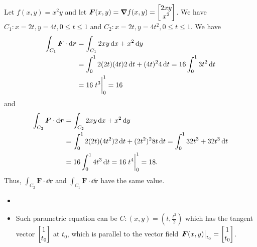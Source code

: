 \documentclass[8pt,twocolumn]{article}
\begin{document}
\begin{Answer}[number=30]
  Let $f(x,y)=x^2y$ and let $\bm{F}(x,y)=\grad f(x,y) = \mqty[2xy\\ x^2]$. We
  have $C_1: x=2t, y=4t, 0\le t\le 1$ and $C_2: x=2t, y=4t^2, 0\le t\le 1$. We
  have
  \begin{align*}
    \int_{C_1} \bm{F}\cdot \dd{\bm{r}} &= \int_{C_1} 2xy \dd{x} + x^2\dd{y} \\
    &= \int_0^1 2(2t)(4t) 2\dd{t} + (4t)^2 4\dd{t} = 16\int_0^1 3t^2\dd{t} \\
    &=16 \eval{t^3}_0^1 = 16
  \end{align*}
  and
  \begin{align*}
    \int_{C_2} \bm{F}\cdot \dd{\bm{r}} &= \int_{C_2} 2xy \dd{x} + x^2\dd{y} \\
    &= \int_0^1 2(2t)(4t^2) 2\dd{t} + (2t^2)^2 8t\dd{t} = \int_0^1 32t^3 + 32t^3\dd{t} \\
    &= 16\int_0^1 4t^3 \dd{t} = 16 \eval{t^4}_0^1 = 18.
  \end{align*}
  Thus, \(\int_{C_2} \bm{F}\cdot \dd{\bm{r}}\) and \(\int_{C_1} \bm{F}\cdot
  \dd{\bm{r}}\) have the same value.
\end{Answer}

\begin{Answer}[number=31]
  \begin{itemize}
    \item
      \item
        Such parametric equation can be $C: (x,y)=(t, \frac{t^2}{2})$ which has the
        tangent vector $\mqty[1\\ t_0]$ at $t_0$, which is parallel to the
        vector field $\eval{\bm{F}(x,y)}_{t_0}=\mqty[1\\t_0]$.
  \end{itemize}
\end{Answer}
\end{document}
